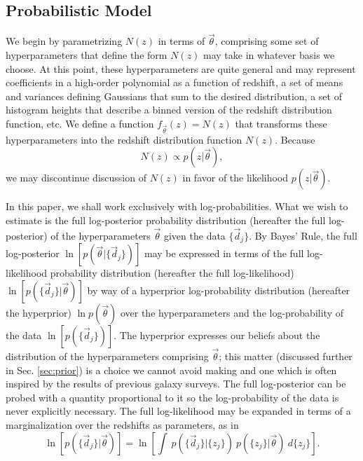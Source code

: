 \documentclass[preprint]{aastex}
\begin{document}
%
\subsection{Probabilistic Model}
\label{sec:prob}

We begin by parametrizing $N(z)$ in terms of $\vec{\theta}$, comprising some 
set of hyperparameters that define the form $N(z)$ may take in whatever basis 
we choose.  At this point, these hyperparameters are quite general and may 
represent coefficients in a high-order polynomial as a function of redshift, a 
set of means and variances defining Gaussians that sum to the desired 
distribution, a set of histogram heights that describe a binned version of the 
redshift distribution function, etc.  We define a function 
$f_{\vec{\theta}}(z)=N(z)$ that transforms these hyperparameters into the 
redshift distribution function $N(z)$.  Because 
\begin{equation}\label{eq:definition} N(z)\propto 
p(z|\vec{\theta}),\end{equation} we may discontinue discussion of $N(z)$ in 
favor of the likelihood $p(z|\vec{\theta})$.

In this paper, we shall work exclusively with log-probabilities.  What we wish 
to estimate is the full log-posterior probability distribution (hereafter the 
full log-posterior) of the hyperparameters $\vec{\theta}$ given the data 
$\{\vec{d}_{j}\}$.  By Bayes' Rule, the full log-posterior 
$\ln[p(\vec{\theta}|\{\vec{d}_{j}\})]$ may be expressed in terms of the full 
log-likelihood probability distribution (hereafter the full log-likelihood) 
$\ln[p(\{\vec{d}_{j}\}|\vec{\theta})]$ by way of a hyperprior log-probability 
distribution (hereafter the hyperprior) $\ln p(\vec{\theta})$ over the 
hyperparameters and the log-probability of the data $\ln[p(\{\vec{d}_{j}\})]$.  
The hyperprior expresses our beliefs about the distribution of the 
hyperparameters comprising $\vec{\theta}$; this matter (discussed further in 
Sec. \ref{sec:prior}) is a choice we cannot avoid making and one which is often 
inspired by the results of previous galaxy surveys.  The full log-posterior can 
be probed with a quantity proportional to it so the log-probability of the data 
is never explicitly necessary.  The full log-likelihood may be expanded in 
terms of a marginalization over the redshifts as parameters, as in 
\begin{equation}\label{eq:marginalize} \ln[p(\{\vec{d}_{j}\}|\vec{\theta})] = 
\ln\left[\int\ p(\{\vec{d}_{j}\}|\{z_{j}\})\ p(\{z_{j}\}|\vec{\theta})\ 
d\{z_{j}\}\right].\end{equation}
\end{document}

